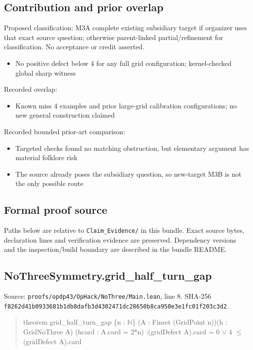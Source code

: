 \documentclass[11pt,a4paper]{article}
\begin{document}
\subsection{Contribution and prior overlap}
Proposed classification: M3A complete existing subsidiary target if organizer uses that exact source question; otherwise parent-linked partial/refinement for classification. No acceptance or credit asserted.

\begin{itemize}
\item No positive defect below 4 for any full grid configuration; kernel-checked global sharp witness
\end{itemize}
Recorded overlap:

\begin{itemize}
\item Known miss 4 examples and prior large-grid calibration configurations; no new general construction claimed
\end{itemize}
Recorded bounded prior-art comparison:

\begin{itemize}
\item Targeted checks found no matching obstruction, but elementary argument has material folklore risk
\end{itemize}
\begin{itemize}
\item The source already poses the subsidiary question, so new-target M3B is not the only possible route
\end{itemize}
\subsection{Formal proof source}
Paths below are relative to \texttt{Claim\_Evidence/} in this bundle. Exact source bytes, declaration lines and verification evidence are preserved. Dependency versions and the inspection/build boundary are described in the bundle README.

\subsection{NoThreeSymmetry.grid\_half\_turn\_gap}
Source: \texttt{proofs/opdp43/OpHack/NoThree/Main.lean}, line 8. SHA-256 \texttt{f8262d41b0933681b1db8dafb3d4302471dc28650b8ca950e3e1fc01f203c3d2}.

\begin{quote}\small\ttfamily theorem grid\_half\_turn\_gap \{n : \ensuremath{\mathbb{N}}\} (A : Finset (GridPoint n))\newline (h : GridNoThree A) (hcard : A.card = 2*n) :\newline (gridDefect A).card = 0 \ensuremath{\vee} 4 \ensuremath{\leq} (gridDefect A).card\end{quote}
\end{document}
